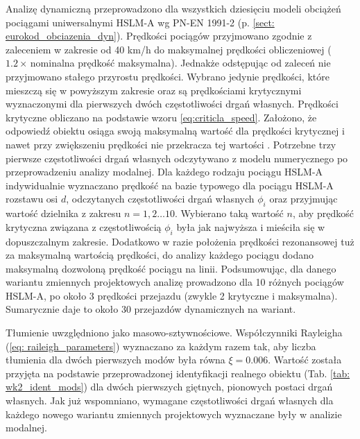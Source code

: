 Analizę dynamiczną przeprowadzono dla wszystkich dziesięciu modeli obciążeń pociągami uniwersalnymi HSLM-A wg PN-EN 1991-2 (p. \ref{sect: eurokod_obciazenia_dyn}). Prędkości pociągów przyjmowano zgodnie z zaleceniem w zakresie od 40 km/h do maksymalnej prędkości obliczeniowej ($1.2\times\,$nominalna prędkość maksymalna). Jednakże odstępując od zaleceń nie przyjmowano stałego przyrostu prędkości. Wybrano jedynie prędkości, które mieszczą się w powyższym zakresie oraz są prędkościami krytycznymi wyznaczonymi dla pierwszych dwóch częstotliwości drgań własnych. Prędkości krytyczne obliczano na podstawie wzoru \ref{eq:criticla_speed}. Założono, że odpowiedź obiektu osiąga swoją maksymalną wartość dla prędkości krytycznej i nawet przy zwiększeniu prędkości nie przekracza tej wartości \parencite{Goicolea2008}. Potrzebne trzy pierwsze częstotliwości drgań własnych odczytywano z modelu numerycznego po przeprowadzeniu analizy modalnej. Dla każdego rodzaju pociągu HSLM-A indywidualnie wyznaczano prędkość na bazie typowego dla pociągu HSLM-A rozstawu osi $d$, odczytanych częstotliwości drgań własnych $\phi_i$ oraz przyjmując wartość dzielnika z zakresu $n = 1,2\dots 10$. Wybierano taką wartość $n$, aby prędkość krytyczna związana z częstotliwością $\phi_i$ była jak najwyższa i mieściła się w dopuszczalnym zakresie. Dodatkowo w razie położenia prędkości rezonansowej tuż za maksymalną wartością prędkości, do analizy każdego pociągu dodano maksymalną dozwoloną prędkość pociągu na linii. Podsumowując, dla danego wariantu zmiennych projektowych analizę prowadzono dla 10 różnych pociągów HSLM-A, po około 3 prędkości przejazdu (zwykle 2 krytyczne i maksymalna). Sumarycznie daje to około 30 przejazdów dynamicznych na wariant.

Tłumienie uwzględniono jako masowo-sztywnościowe. Współczynniki Rayleigha (\ref{eq: raileigh_parameters}) wyznaczano za każdym razem tak, aby liczba tłumienia dla dwóch pierwszych modów była równa $\xi=0.006$. Wartość została przyjęta na podstawie przeprowadzonej identyfikacji realnego obiektu (Tab. \ref{tab: wk2_ident_mods}) dla dwóch pierwszych giętnych, pionowych postaci drgań własnych. Jak już wspomniano, wymagane częstotliwości drgań własnych dla każdego nowego wariantu zmiennych projektowych wyznaczane były w analizie modalnej.


